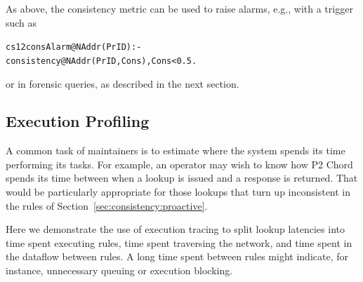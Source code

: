 \documentclass{sig-alt-full}
\newenvironment{overlog}{\begin{alltt}\footnotesize}{\end{alltt}}
\begin{document}
As above, the consistency metric can be used to raise
alarms, e.g., with a trigger such as
\begin{overlog}
cs12 consAlarm@NAddr(PrID) :-
   consistency@NAddr(PrID, Cons), Cons < 0.5.
\end{overlog}
or in forensic queries, as described in the next section.

















\subsection{Execution Profiling}
\label{sec:examples:profiling}

A common task of maintainers is to estimate where the
system spends its time performing its tasks.  For
example, an operator may wish to know how P2 Chord
spends its time between when a lookup is issued
and a response is returned.  That would be particularly
appropriate for those lookups that turn up inconsistent in
the rules of Section~\ref{sec:consistency:proactive}.

Here we demonstrate the use of execution
tracing to split lookup latencies into time spent
executing rules, time spent traversing the network, and
time spent in the dataflow between rules.  A long time
spent between rules might indicate, for instance, unnecessary queuing or
execution blocking.
\end{document}
